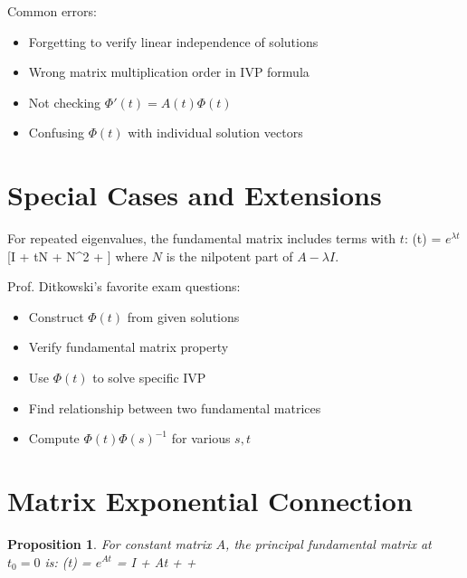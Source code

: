 \documentclass[12pt]{article}
\newtheorem{proposition}{Proposition}
\begin{document}
\begin{warning}
Common errors:
\begin{itemize}
\item Forgetting to verify linear independence of solutions
\item Wrong matrix multiplication order in IVP formula
\item Not checking $\Phi'(t) = A(t)\Phi(t)$
\item Confusing $\Phi(t)$ with individual solution vectors
\end{itemize}
\end{warning}

\section{Special Cases and Extensions}

\begin{insight}
For repeated eigenvalues, the fundamental matrix includes terms with $t$:
\Phi(t) = $e^{\lambda t}$[I + tN + N^{2} + \cdots]
where $N$ is the nilpotent part of $A - \lambda I$.
\end{insight}

\begin{examtip}
Prof. Ditkowski's favorite exam questions:
\begin{itemize}
\item Construct $\Phi(t)$ from given solutions
\item Verify fundamental matrix property
\item Use $\Phi(t)$ to solve specific IVP
\item Find relationship between two fundamental matrices
\item Compute $\Phi(t)\Phi(s)^{-1}$ for various $s, t$
\end{itemize}
\end{examtip}

\section{Matrix Exponential Connection}

\begin{proposition}
For constant matrix $A$, the principal fundamental matrix at $t_{0} = 0$ is:
\Phi(t) = $e^{At}$ = I + At +  + \cdots
\end{proposition}
\end{document}
